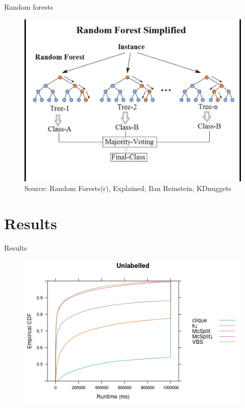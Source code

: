 \documentclass{beamer}
\begin{document}
\begin{frame}{Random forests \parencite{DBLP:journals/ml/Breiman01}}
  \begin{figure}
    \centering
    \includegraphics[scale=0.5]{rand-forest-1.jpg} \\
    {\tiny\color{gray}Source: Random Forests(r), Explained, Ilan Reinstein, KDnuggets}
  \end{figure}
\end{frame}

\section{Results}

\begin{frame}{Results}
  \begin{figure}
    \centering
    \includegraphics[width=\textwidth]{../dissertation/images/ecdf_unlabelled.png}
  \end{figure}
\end{frame}
\end{document}
